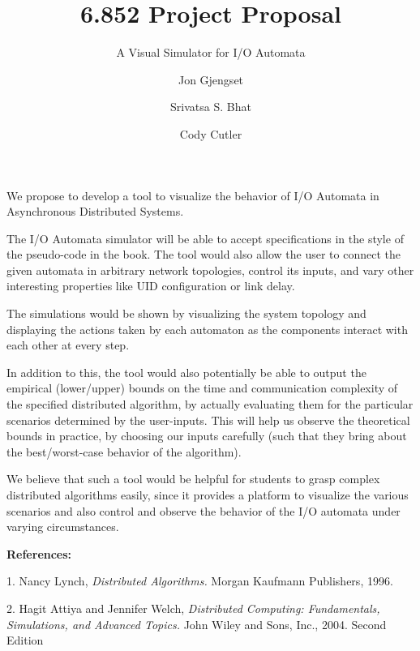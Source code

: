 \documentclass{scrartcl}
\title{6.852 Project Proposal}
\subtitle{A Visual Simulator for I/O Automata}
\author{Jon Gjengset \and Srivatsa S. Bhat \and Cody Cutler}
\begin{document}
\maketitle

We propose to develop a tool to visualize the behavior of I/O Automata in
Asynchronous Distributed Systems.

The I/O Automata simulator will be able to accept specifications in the style
of the pseudo-code in the book. The tool would also allow the user to connect
the given automata in arbitrary network topologies, control its inputs, and
vary other interesting properties like UID configuration or link delay.

The simulations would be shown by visualizing the system topology and
displaying the actions taken by each automaton as the components interact with
each other at every step.

In addition to this, the tool would also potentially be able to output the
empirical (lower/upper) bounds on the time and communication complexity of the
specified distributed algorithm, by actually evaluating them for the particular
scenarios determined by the user-inputs.  This will help us observe the
theoretical bounds in practice, by choosing our inputs carefully (such that
they bring about the best/worst-case behavior of the algorithm). 

We believe that such a tool would be helpful for students to grasp complex
distributed algorithms easily, since it provides a platform to visualize the
various scenarios and also control and observe the behavior of the I/O automata
under varying circumstances.

\vspace{2mm}
\textbf{References:}

1. Nancy Lynch, \textit{Distributed Algorithms.} Morgan Kaufmann Publishers, 1996.

2. Hagit Attiya and Jennifer Welch, \textit{Distributed Computing: Fundamentals, Simulations, and Advanced Topics.} John Wiley and Sons, Inc., 2004. Second Edition
\end{document}
